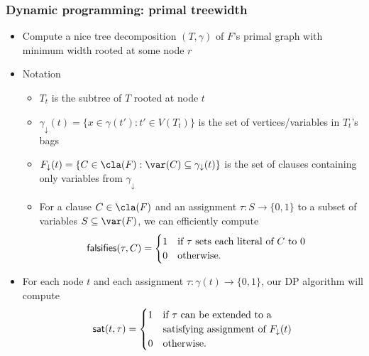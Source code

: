 \begin{frame}
  \frametitle{Dynamic programming: primal treewidth}

  \begin{itemize}
   \item Compute a nice tree decomposition $(T,\gamma)$ of $F$'s primal graph with minimum width rooted at some node $r$ \cite{Bodlaender96, Kloks94}
   \pause
   \item Notation
   \begin{itemize}
   \item $T_t$ is the subtree of $T$ rooted at node $t$
   \item $\gamma_\downarrow (t) = \{ x\in \gamma(t') : t' \in V(T_t)\}$ is the set of vertices/variables in $T_t$'s bags
   \item $F_\downarrow (t) = \{ C\in \cla(F) : \var(C) \subseteq \gamma_\downarrow (t) \}$ is the set of clauses containing only variables from $\gamma_\downarrow$
   \item For a clause $C\in \cla(F)$ and an assignment $\tau : S\rightarrow \{0,1\}$ to a subset of variables $S\subseteq \var(F)$, we can efficiently compute
   \begin{align*}
   \mathsf{falsifies}(\tau,C) &= \begin{cases}
   1 & \text{if $\tau$ sets each literal of $C$ to 0}\\
   0 & \text{otherwise.}
   \end{cases}
   \end{align*}
   \end{itemize}
   \pause
   \item For each node $t$ and each assignment $\tau: \gamma(t) \rightarrow \{0,1\}$, our DP algorithm will compute
         \begin{align*}
         \mathsf{sat}(t,\tau) = \begin{cases}1 & \text{if $\tau$ can be extended to a}\\ & \text{satisfying assignment of $F_\downarrow (t)$}\\0 & \text{otherwise.} \end{cases}
         \end{align*}
  \end{itemize}

\end{frame}



